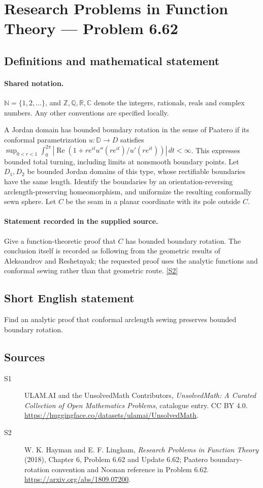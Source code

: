 \documentclass[11pt]{article}
\newcommand{\sref}[2]{\hyperlink{source:#1:#2}{[S#2]}}
\begin{document}
\section{Research Problems in Function Theory — Problem 6.62}\label{statement}

\subsection{Definitions and mathematical statement}

\paragraph{Shared notation.}$\mathbb N=\{1,2,\ldots\}$, and $\mathbb Z,\mathbb Q,\mathbb R,\mathbb C$ denote the integers, rationals, reals and complex numbers. Any other conventions are specified locally.


A Jordan domain has bounded boundary rotation in the sense of Paatero if its conformal parametrization $u:\mathbb D\to D$ satisfies $\sup_{0<r<1}\int_0^{2\pi}|\operatorname{Re}(1+re^{it}u''(re^{it})/u'(re^{it}))|\,dt<\infty$. This expresses bounded total turning, including limits at nonsmooth boundary points. Let $D_1,D_2$ be bounded Jordan domains of this type, whose rectifiable boundaries have the same length. Identify the boundaries by an orientation-reversing arclength-preserving homeomorphism, and uniformize the resulting conformally sewn sphere. Let $C$ be the seam in a planar coordinate with its pole outside $C$.
\paragraph{Statement recorded in the supplied source.}
Give a function-theoretic proof that $C$ has bounded boundary rotation. The conclusion itself is recorded as following from the geometric results of Aleksandrov and Reshetnyak; the requested proof uses the analytic functions and conformal sewing rather than that geometric route. \sref{statement}{2}
\subsection{Short English statement}
Find an analytic proof that conformal arclength sewing preserves bounded boundary rotation.
\subsection{Sources}
\begin{description}
\item[\hypertarget{source:statement:1}{S1}] ULAM.AI and the UnsolvedMath Contributors, \emph{UnsolvedMath: A Curated Collection of Open Mathematics Problems}, catalogue entry. CC BY 4.0. \url{https://huggingface.co/datasets/ulamai/UnsolvedMath}.
\item[\hypertarget{source:statement:2}{S2}] W. K. Hayman and E. F. Lingham, \emph{Research Problems in Function Theory} (2018), Chapter 6, Problem 6.62 and Update 6.62; Paatero boundary-rotation convention and Noonan reference in Problem 6.62. \url{https://arxiv.org/abs/1809.07200}.
\end{description}
\label{end:statement}
\end{document}
